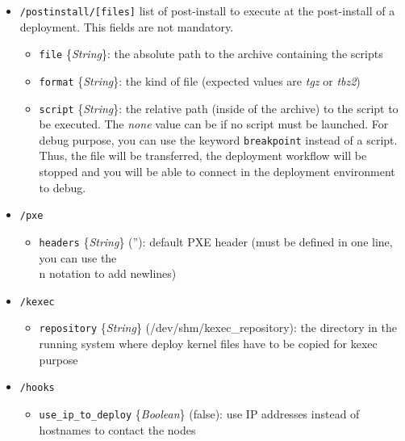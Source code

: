 \documentclass[a4wide,10pt,oneside]{book}
\newcommand{\ypath}[1]{\texttt{#1}}
\newcommand{\yfield}[2]{\texttt{#1} {\small\{{\emph{#2}}\}}:}
\newcommand{\yfieldd}[3]{\texttt{#1} {\small\{{\emph{#2}}\}} {\small(}#3{\small)}:}
\begin{document}
\begin{itemize}
  \item \ypath{/postinstall/[files]} list of post-install to execute at the post-install of a deployment. This fields are not mandatory. 
  \begin{itemize}
    \item \yfield{file}{String} the absolute path to the archive containing the scripts
    \item \yfield{format}{String} the kind of file (expected values are \emph{tgz} or \emph{tbz2})
    \item \yfield{script}{String} the relative path (inside of the archive) to the script to be executed. The \textit{none} value can be if no script must be launched. For debug purpose, you can use the keyword \texttt{breakpoint} instead of a script. Thus, the file will be transferred, the deployment workflow will be stopped and you will be able to connect in the deployment environment to debug. 
  \end{itemize}

  \item \ypath{/pxe}
  \begin{itemize}
    \item \yfieldd{headers}{String}{''} default PXE header (must be defined in one line, you can use the \\n notation to add newlines)
  \end{itemize}

  \item \ypath{/kexec}
  \begin{itemize}
    \item \yfieldd{repository}{String}{/dev/shm/kexec\_repository} the directory in the running system where deploy kernel files have to be copied for kexec purpose
  \end{itemize}

  \item \ypath{/hooks}
  \begin{itemize}
    \item \yfieldd{use\_ip\_to\_deploy}{Boolean}{false} use IP addresses instead of hostnames to contact the nodes
  \end{itemize}


\end{itemize}
\end{document}
